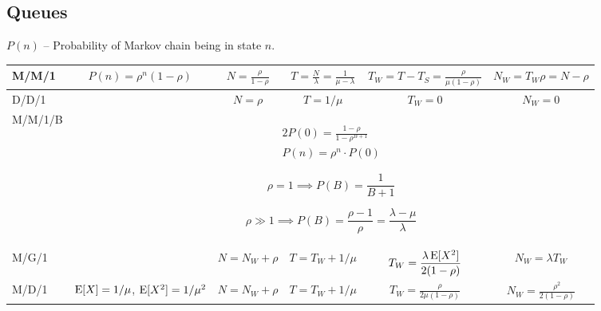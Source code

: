 \documentclass{form}
\begin{document}
\subsection*{Queues}
$P(n)$ -- Probability of Markov chain being in state $n$.
\begin{center}
    \begin{tabular}{l || c | c | c | c | c }
        M/M/1   & $\displaystyle P(n) = \rho^n(1-\rho)$   & $\displaystyle N=\frac{\rho}{1-\rho}$ & $\displaystyle T=\frac{N}{\lambda} = \frac{1}{\mu-\lambda}$ & $\displaystyle T_W = T-T_S = \frac{\rho}{\mu(1-\rho)}$ & $\displaystyle N_W = T_W \rho = N-\rho$ \\ \hline
        D/D/1   &                                         & $\displaystyle N=\rho$                & $\displaystyle T=1/\mu$                                     & $\displaystyle T_W = 0$                                & $\displaystyle N_W = 0$                 \\ \hline
        M/M/1/B & \multicolumn{5}{c}{
            \begin{minipage}{0.15\textwidth}
                \vspace{-0.8em}
                \begin{alignat*}{2}
                    P(0) = \frac{1-\rho}{1-\rho^{B+1}} \\
                    P(n) = \rho^n\cdot P(0)
                \end{alignat*}
            \end{minipage}
            \begin{minipage}{0.35\textwidth}
                \vspace{-0.8em}
                \begin{equation*}
                    \rho = 1 \implies P(B) = \frac{1}{B+1}
                \end{equation*}
            \end{minipage}
            \begin{minipage}{0.30\textwidth}
                \vspace{-0.8em}
                \begin{equation*}
                    \rho \gg 1 \implies P(B) = \frac{\rho-1}{\rho} = \frac{\lambda - \mu}{\lambda}
                \end{equation*}
            \end{minipage}
        } \\ \hline
        M/G/1   &                                         & $\displaystyle N=N_W + \rho$                & $\displaystyle T=T_W+1/\mu$                             & $\displaystyle T_W = \frac{\lambda \operatorname{E}[X^2]}{2(1-\rho)}$                    & $\displaystyle N_W = \lambda T_W$                 \\ \hline
        M/D/1   & $\operatorname{E}[X]=1/\mu$, $\operatorname{E}[X^2]=1/\mu^2$ & $\displaystyle N=N_W + \rho$                & $\displaystyle T=T_W+1/\mu$                             & $\displaystyle T_W = \frac{\rho}{2 \mu (1-\rho)}$                    & $\displaystyle N_W = \frac{\rho^2}{2 (1-\rho)}$                 \\
    \end{tabular}
\end{center}
\end{document}
